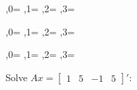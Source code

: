 \documentclass[a4paper]{article}
\begin{document}
	,0\of\pgfplotsmatrix=\pgfmathresult
{}	,1\of\pgfplotsmatrix=\pgfmathresult
{}	,2\of\pgfplotsmatrix=\pgfmathresult
{}	,3\of\pgfplotsmatrix=\pgfmathresult

	,0\of\pgfplotsmatrix=\pgfmathresult
{}	,1\of\pgfplotsmatrix=\pgfmathresult
{}	,2\of\pgfplotsmatrix=\pgfmathresult
{}	,3\of\pgfplotsmatrix=\pgfmathresult

	,0\of\pgfplotsmatrix=\pgfmathresult
{}	,1\of\pgfplotsmatrix=\pgfmathresult
{}	,2\of\pgfplotsmatrix=\pgfmathresult
{}	,3\of\pgfplotsmatrix=\pgfmathresult
\showfourxfour

\of\pgfplotsperm{}
\of\pgfplotsperm{}
\of\pgfplotsperm{}
\of\pgfplotsperm{}
\fi

Solve $Ax = \begin{bmatrix}1 & 5 & -1& 5\end{bmatrix}'$:
\pgfplotsarraynew{}
\pgfplotsmatrixLUbacksubst\pgfplotsmatrix\perm\pgfplotsperm\inout\pgfplotsrhs

\pgfplotsarrayforeach\pgfplotsrhs\as\elem{%
	\pgfplotsarrayforeachindex: \pgfmathprintnumber\elem\par
}%
\end{document}
